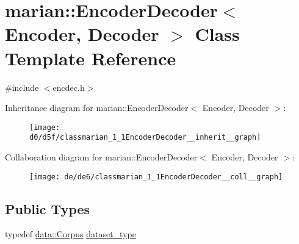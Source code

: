 \hypertarget{classmarian_1_1EncoderDecoder}{}\section{marian\+:\+:Encoder\+Decoder$<$ Encoder, Decoder $>$ Class Template Reference}
\label{classmarian_1_1EncoderDecoder}


{\ttfamily \#include $<$encdec.\+h$>$}



Inheritance diagram for marian\+:\+:Encoder\+Decoder$<$ Encoder, Decoder $>$\+:
\nopagebreak
\begin{figure}[H]
\begin{center}
\leavevmode
\texttt{[image: d0/d5f/classmarian\_1\_1EncoderDecoder\_\_inherit\_\_graph]}
\end{center}
\end{figure}


Collaboration diagram for marian\+:\+:Encoder\+Decoder$<$ Encoder, Decoder $>$\+:
\nopagebreak
\begin{figure}[H]
\begin{center}
\leavevmode
\texttt{[image: de/de6/classmarian\_1\_1EncoderDecoder\_\_coll\_\_graph]}
\end{center}
\end{figure}
\subsection*{Public Types}
\begin{DoxyCompactItemize}
\item 
typedef \hyperlink{classmarian_1_1data_1_1Corpus}{data\+::\+Corpus} \hyperlink{classmarian_1_1EncoderDecoder_abe6c265b398b2bd947e93fb0a11761b3}{dataset\+\_\+type}
\end{DoxyCompactItemize}
